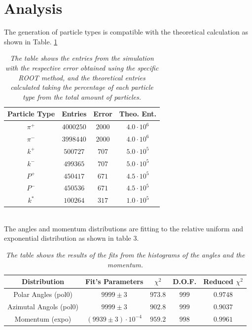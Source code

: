 \documentclass[a4paper, 11pt]{article}
\begin{document}
    \section{Analysis}
    The generation of particle types is compatible with the theoretical calculation as shown in Table. \ref{Table 2}
    \begin{table}[h!]
      \centering
      \begin{tabular}{ c c c c }
        \hline
        Particle Type & Entries & Error & Theo. Ent. \\
        \hline
        $\pi^+$ & $4000250$ & $2000$ & $4.0\cdot10^6$\\
        $\pi^-$ & $3998440$ & $2000$ & $4.0\cdot10^6$\\
        $k^+$ & $500727$ & $707$ & $5.0\cdot10^5$\\
        $k^-$ & $499365$ & $707$ & $5.0\cdot10^5$\\
        $P^+$ & $450417$ & $671$ & $4.5\cdot10^5$\\
        $P^-$ & $450536$ & $671$ & $4.5\cdot10^5$\\
        $k^*$ & $100264$ & $317$ & $1.0\cdot10^5$\\
        \hline
      \end{tabular}
      \caption{ \label{Table 2}
      \textit{The table shows the entries from the simulation with the respective error obtained using the specific ROOT method, and the theoretical entries calculated taking the percentage of each particle type from the total amount of particles.}
      }
    \end{table}\\
    The angles and momentum distributions are fitting to the relative uniform and exponential distribution as shown in table 3.
    \begin{table}[h!]
      \centering
      \begin{tabular}{ c | c c c c }
        \hline
        Distribution & Fit's Parameters & $\chi^2$ & D.O.F. & Reduced $\chi^2$ \\
        \hline
        Polar Angles (pol0) & $9999\pm3$ & $973.8$ & $999$ & $0.9748$\\
        Azimutal Angols (pol0) & $9999\pm3$ & $902.8$ & $999$ & $0.9037$\\
        Momentum (expo) & $(9939 \pm 3)\cdot10^{-4}$ & $959.2$ & $998$ & $0.9961$ \\
        \hline
      \end{tabular}
      \caption{ \label{Table 3}
      \textit{The table shows the results of the fits from the histograms of the angles and the momentum.}
      }
    \end{table}
\end{document}
